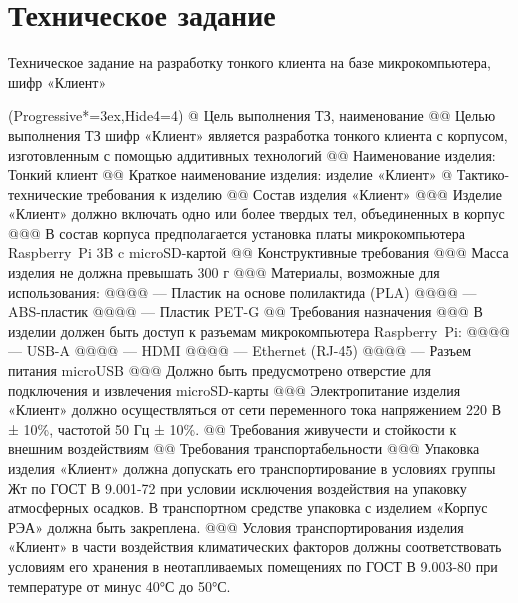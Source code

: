 \section{Техническое задание}

Техническое задание на разработку тонкого клиента на базе микрокомпьютера, шифр «Клиент»

\begin{easylist}[articletoc]
\ListProperties(Progressive*=3ex,Hide4=4)
@ Цель выполнения ТЗ, наименование
@@ Целью выполнения ТЗ шифр «Клиент» является разработка тонкого клиента с корпусом,
изготовленным с помощью аддитивных технологий
@@ Наименование изделия: Тонкий клиент
@@ Краткое наименование изделия: изделие «Клиент»
@ Тактико-технические требования к изделию
@@ Состав изделия «Клиент»
@@@ Изделие «Клиент» должно включать одно или более твердых тел, объединенных в корпус
@@@ В состав корпуса предполагается установка платы микрокомпьютера Raspberry~Pi 3B c
microSD-картой
@@ Конструктивные требования
@@@ Масса изделия не должна превышать 300 г
@@@ Материалы, возможные для использования: 
@@@@ — Пластик на основе полилактида (PLA)
@@@@ — ABS-пластик
@@@@ — Пластик PET-G
@@ Требования назначения
@@@ В изделии должен быть доступ к разъемам микрокомпьютера Raspberry~Pi:
@@@@ — USB-A
@@@@ — HDMI
@@@@ — Ethernet (RJ-45)
@@@@ — Разъем питания microUSB
@@@ Должно быть предусмотрено отверстие для подключения и извлечения microSD-карты
@@@ Электропитание изделия «Клиент» должно осуществляться от сети
переменного тока напряжением 220 В ± 10\%, частотой 50 Гц ± 10\%.
@@ Требования живучести и стойкости к внешним воздействиям
@@ Требования транспортабельности
@@@ Упаковка изделия «Клиент» должна допускать его транспортирование
в условиях группы Жт по ГОСТ В 9.001-72 при условии исключения воздействия
на упаковку атмосферных осадков. В транспортном средстве упаковка с
изделием «Корпус РЭА» должна быть закреплена.
@@@ Условия транспортирования изделия «Клиент» в части воздействия
климатических факторов должны соответствовать условиям его хранения в
неотапливаемых помещениях по ГОСТ В 9.003-80 при температуре от минус
40°С до 50°С.
\end{easylist}

